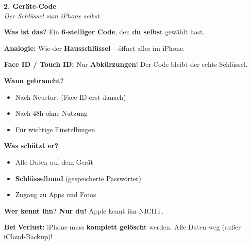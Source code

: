 \documentclass[a4paper,landscape,11pt]{article}
\begin{document}
\hfill%
\begin{minipage}[t]{0.32\linewidth}
\begin{center}
\colorbox{devicegreen!10}{%
\begin{minipage}{0.95\linewidth}
\vspace{2mm}
\begin{center}
{\Large\bfseries\textcolor{devicegreen}{2. Geräte-Code}}\\[1pt]
{\footnotesize\itshape Der Schlüssel zum iPhone selbst}
\end{center}
\vspace{2mm}
\end{minipage}%
}
\end{center}

\vspace{1mm}

\textbf{Was ist das?} Ein \textbf{6-stelliger Code}, den \textbf{du selbst} gewählt hast.

\textbf{Analogie:} Wie der \textbf{Hausschlüssel} -- öffnet alles im iPhone.

\textbf{Face ID / Touch ID:} Nur \textbf{Abkürzungen}! Der Code bleibt der echte Schlüssel.

\textbf{Wann gebraucht?}
\begin{itemize}
\item Nach Neustart (Face ID erst danach)
\item Nach 48h ohne Nutzung
\item Für wichtige Einstellungen
\end{itemize}

\textbf{Was schützt er?}
\begin{itemize}
\item Alle Daten auf dem Gerät
\item \textbf{Schlüsselbund} (gespeicherte Passwörter)
\item Zugang zu Apps und Fotos
\end{itemize}

\textbf{Wer kennt ihn?} \textbf{Nur du!} Apple kennt ihn NICHT.

\textbf{Bei Verlust:} iPhone muss \textbf{komplett gelöscht} werden. Alle Daten weg (außer iCloud-Backup)!

\end{minipage}%
\hfill%
\end{document}
